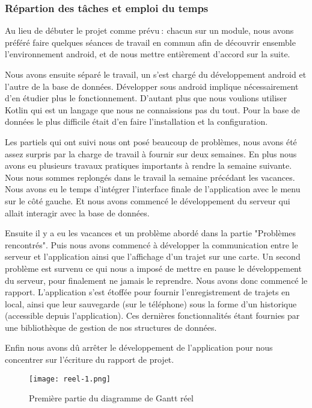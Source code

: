 \subsubsection{Répartion des tâches et emploi du temps}
Au lieu de débuter le projet comme prévu$\ :\ $chacun sur un module, nous avons préféré faire quelques séances de travail en commun afin de découvrir ensemble l'environnement android, et de nous mettre entièrement d'accord sur la suite.
\par
Nous avons ensuite séparé le travail, un s'est chargé du développement android et l'autre de la base de données. Développer sous android implique nécessairement d'en étudier plus le fonctionnement. D'autant plus que nous voulions utiliser Kotlin qui est un langage que nous ne connaissions pas du tout.
Pour la base de données le plus difficile était d'en faire l'installation et la configuration.
\par
Les partiels qui ont suivi nous ont posé beaucoup de problèmes, nous avons été assez surpris par la charge de travail à fournir sur deux semaines. En plus nous avons eu plusieurs travaux pratiques importants à rendre la semaine suivante.
Nous nous sommes replongés dans le travail la semaine précédant les vacances. Nous avons eu le temps d'intégrer l'interface finale de l'application avec le menu sur le côté gauche. Et nous avons commencé le développement du serveur qui allait interagir avec la base de données.
\par
Ensuite il y a eu les vacances et un problème abordé dans la partie "Problèmes rencontrés". Puis nous avons commencé à développer la communication entre le serveur et l'application ainsi que l'affichage d'un trajet sur une carte. Un second problème est survenu ce qui nous a imposé de mettre en pause le développement du serveur, pour finalement ne jamais le reprendre.
Nous avons donc commencé le rapport. L'application s'est étoffée pour fournir l'enregistrement de trajets en local, ainsi que leur sauvegarde (sur le téléphone) sous la forme d'un historique (accessible depuis l'application).
Ces dernières fonctionnalités étant fournies par une bibliothèque de gestion de nos structures de données.
\par
Enfin nous avons dû arrêter le développement de l'application pour nous concentrer sur l'écriture du rapport de projet.
\vfill
\begin{figure}[!h]
    \begin{center}
        \texttt{[image: reel-1.png]}
        \caption{Première partie du diagramme de Gantt réel}
    \end{center}
\end{figure}
\newpage
